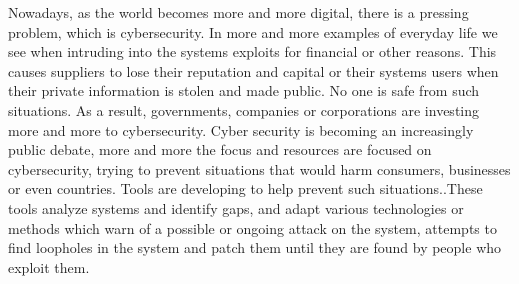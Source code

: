 Nowadays, as the world becomes more and more digital, there is a pressing problem, which is cybersecurity. In more and more examples of everyday life we ​​see when intruding into the systems exploits for financial or other reasons. This causes suppliers to lose their reputation and capital or their systems users when their private information is stolen and made public. No one is safe from such situations. As a result, governments, companies or corporations are investing more and more
to cybersecurity. Cyber ​​security is becoming an increasingly public debate, more and more
the focus and resources are focused on cybersecurity, trying to prevent situations that would harm consumers, businesses or even countries. Tools are developing to help prevent such situations..These tools analyze systems and identify gaps, and adapt various technologies or methods
which warn of a possible or ongoing attack on the system, attempts to find loopholes in the system and
patch them until they are found by people who exploit them.